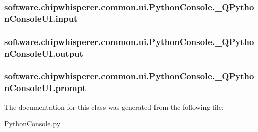\subsubsection[{input}]{\setlength{\rightskip}{0pt plus 5cm}software.\+chipwhisperer.\+common.\+ui.\+Python\+Console.\+\_\+\+Q\+Python\+Console\+U\+I.\+input}\label{classsoftware_1_1chipwhisperer_1_1common_1_1ui_1_1PythonConsole_1_1__QPythonConsoleUI_abf09ccb74a97849113141a1b15daa8e4}
\hypertarget{classsoftware_1_1chipwhisperer_1_1common_1_1ui_1_1PythonConsole_1_1__QPythonConsoleUI_abf915822ac4181722e15c01246bbf4c5}{}
\subsubsection[{output}]{\setlength{\rightskip}{0pt plus 5cm}software.\+chipwhisperer.\+common.\+ui.\+Python\+Console.\+\_\+\+Q\+Python\+Console\+U\+I.\+output}\label{classsoftware_1_1chipwhisperer_1_1common_1_1ui_1_1PythonConsole_1_1__QPythonConsoleUI_abf915822ac4181722e15c01246bbf4c5}
\hypertarget{classsoftware_1_1chipwhisperer_1_1common_1_1ui_1_1PythonConsole_1_1__QPythonConsoleUI_afaaabc93a25a45840aa2a6babcdca2ef}{}
\subsubsection[{prompt}]{\setlength{\rightskip}{0pt plus 5cm}software.\+chipwhisperer.\+common.\+ui.\+Python\+Console.\+\_\+\+Q\+Python\+Console\+U\+I.\+prompt}\label{classsoftware_1_1chipwhisperer_1_1common_1_1ui_1_1PythonConsole_1_1__QPythonConsoleUI_afaaabc93a25a45840aa2a6babcdca2ef}


The documentation for this class was generated from the following file\+:\begin{DoxyCompactItemize}
\item 
\hyperlink{PythonConsole_8py}{Python\+Console.\+py}\end{DoxyCompactItemize}
